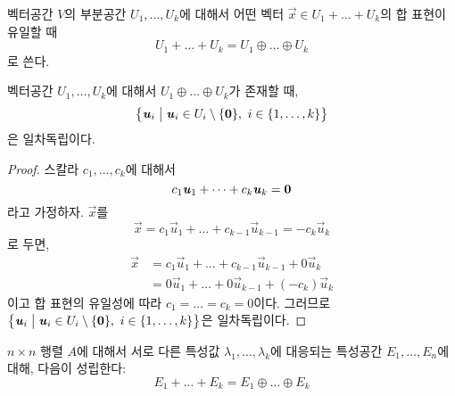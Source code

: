 \documentclass[../engineering_mathematics_lecture_note.tex]{subfiles}
\begin{document}
\begin{definition}
    벡터공간 $V$의 부분공간 $U_1, \dots, U_k$에 대해서 어떤 벡터 $\vec x \in U_1 + \dots + U_k$의 합 표현이 유일할 때
    \begin{equation*}
        U_1 + \dots + U_k = U_1 \oplus \dots \oplus U_k
    \end{equation*}
    로 쓴다.
\end{definition}

\begin{theorem} \label{thm:linear_independence_directsum}
    벡터공간 $U_1, \dots, U_k$에 대해서 $U_1 \oplus \dots \oplus U_k$가 존재할 때,
    \begin{equation*}
        \bigl\{\bm{\mathit{u}}_i \bigm| \bm{\mathit{u}}_i \in U_i \setminus \{\bm{\mathrm{0}}\},\ i \in \{1, \dots, k\}\bigr\}
    \end{equation*}
    은 일차독립이다.
\end{theorem}

\begin{proof}
    스칼라 $c_1, \dots, c_k$에 대해서
    \begin{equation*}
        c_1 \bm{\mathit{u}}_1 + \dots + c_k \bm{\mathit{u}}_k = \bm{\mathrm{0}}
    \end{equation*}
    라고 가정하자.
    $\vec x$를
    \begin{equation*}
        \vec x = c_1 \vec u_1 + \dots + c_{k - 1} \vec u_{k - 1} = -c_k \vec u_k
    \end{equation*}
    로 두면,
    \begin{align*}
        \vec x &= c_1 \vec u_1 + \dots + c_{k - 1} \vec u_{k - 1} + 0 \vec u_k\\
               &= 0 \vec u_1 + \dots + 0 \vec u_{k - 1} + (-c_k) \vec u_k
    \end{align*}
    이고 합 표현의 유일성에 따라 $c_1 = \dots = c_k = 0$이다.
    그러므로 $\bigl\{\bm{\mathit{u}}_i \bigm| \bm{\mathit{u}}_i \in U_i \setminus \{\bm{\mathrm{0}}\},\ i \in \{1, \dots, k\}\bigr\}$은 일차독립이다.
\end{proof}

\begin{theorem} \label{thm:eigenspace_directsum}
    $n \times n$ 행렬 $A$에 대해서 서로 다른 특성값 $\lambda_1, \dots, \lambda_k$에 대응되는 특성공간 $E_1, \dots, E_n$에 대해, 다음이 성립한다:
    \begin{equation*}
        E_1 + \dots + E_k = E_1 \oplus \dots \oplus E_k
    \end{equation*}
\end{theorem}
\end{document}
